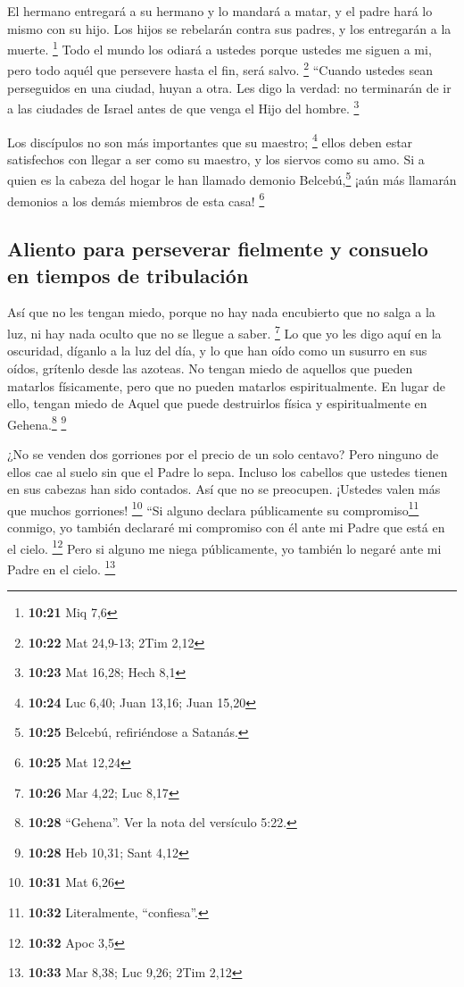  El hermano entregará a su hermano y lo mandará a matar,
y el padre hará lo mismo con su hijo. Los hijos se rebelarán contra sus
padres, y los entregarán a la muerte. \footnote{\textbf{10:21} Miq 7,6}
 Todo el mundo los odiará a ustedes porque ustedes me
siguen a mi, pero todo aquél que persevere hasta el fin, será salvo.
\footnote{\textbf{10:22} Mat 24,9-13; 2Tim 2,12} 
``Cuando ustedes sean perseguidos en una ciudad, huyan a otra. Les digo
la verdad: no terminarán de ir a las ciudades de Israel antes de que
venga el Hijo del hombre. \footnote{\textbf{10:23} Mat 16,28; Hech 8,1}

 Los discípulos no son más importantes que su maestro;
\footnote{\textbf{10:24} Luc 6,40; Juan 13,16; Juan 15,20}
 ellos deben estar satisfechos con llegar a ser como su
maestro, y los siervos como su amo. Si a quien es la cabeza del hogar le
han llamado demonio Belcebú,\footnote{\textbf{10:25} Belcebú,
  refiriéndose a Satanás.} ¡aún más llamarán demonios a los demás
miembros de esta casa! \footnote{\textbf{10:25} Mat 12,24}

\hypertarget{aliento-para-perseverar-fielmente-y-consuelo-en-tiempos-de-tribulaciuxf3n}{%
\subsection{Aliento para perseverar fielmente y consuelo en tiempos de
tribulación}\label{aliento-para-perseverar-fielmente-y-consuelo-en-tiempos-de-tribulaciuxf3n}}

 Así que no les tengan miedo, porque no hay nada
encubierto que no salga a la luz, ni hay nada oculto que no se llegue a
saber. \footnote{\textbf{10:26} Mar 4,22; Luc 8,17}  Lo
que yo les digo aquí en la oscuridad, díganlo a la luz del día, y lo que
han oído como un susurro en sus oídos, grítenlo desde las azoteas.
 No tengan miedo de aquellos que pueden matarlos
físicamente, pero que no pueden matarlos espiritualmente. En lugar de
ello, tengan miedo de Aquel que puede destruirlos física y
espiritualmente en Gehena.\footnote{\textbf{10:28} ``Gehena''. Ver la
  nota del versículo 5:22.} \footnote{\textbf{10:28} Heb 10,31; Sant
  4,12}

 ¿No se venden dos gorriones por el precio de un solo
centavo? Pero ninguno de ellos cae al suelo sin que el Padre lo sepa.
 Incluso los cabellos que ustedes tienen en sus cabezas
han sido contados.  Así que no se preocupen. ¡Ustedes
valen más que muchos gorriones! \footnote{\textbf{10:31} Mat 6,26}
 ``Si alguno declara públicamente su
compromiso\footnote{\textbf{10:32} Literalmente, ``confiesa''.} conmigo,
yo también declararé mi compromiso con él ante mi Padre que está en el
cielo. \footnote{\textbf{10:32} Apoc 3,5}  Pero si alguno
me niega públicamente, yo también lo negaré ante mi Padre en el cielo.
\footnote{\textbf{10:33} Mar 8,38; Luc 9,26; 2Tim 2,12}

